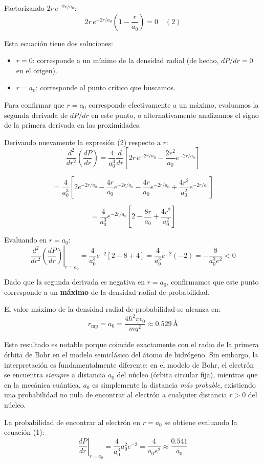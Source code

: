 \documentclass[a4paper]{article}
\begin{document}
Factorizando $2r \, e^{-2r/a_0}$:
$$2r \, e^{-2r/a_0} \left(1 - \frac{r}{a_0}\right) = 0 \quad (2)$$

Esta ecuación tiene dos soluciones:
\begin{itemize}
\item $r = 0$: corresponde a un mínimo de la densidad radial (de hecho, $dP/dr = 0$ en el origen).
\item $r = a_0$: corresponde al punto crítico que buscamos.
\end{itemize}

Para confirmar que $r = a_0$ corresponde efectivamente a un máximo, evaluamos la segunda derivada de $dP/dr$ en este punto, o alternativamente analizamos el signo de la primera derivada en las proximidades.

Derivando nuevamente la expresión (2) respecto a $r$:
$$\frac{d^2}{dr^2}\left(\frac{dP}{dr}\right) = \frac{4}{a_0^3} \frac{d}{dr}\left[2r \, e^{-2r/a_0} - \frac{2r^2}{a_0} e^{-2r/a_0}\right]$$

$$= \frac{4}{a_0^3} \left[2 e^{-2r/a_0} - \frac{4r}{a_0} e^{-2r/a_0} - \frac{4r}{a_0} e^{-2r/a_0} + \frac{4r^2}{a_0^2} e^{-2r/a_0}\right]$$

$$= \frac{4}{a_0^3} e^{-2r/a_0} \left[2 - \frac{8r}{a_0} + \frac{4r^2}{a_0^2}\right]$$

Evaluando en $r = a_0$:
$$\left.\frac{d^2}{dr^2}\left(\frac{dP}{dr}\right)\right|_{r=a_0} = \frac{4}{a_0^3} e^{-2} \left[2 - 8 + 4\right] = \frac{4}{a_0^3} e^{-2} (-2) = -\frac{8}{a_0^3 e^2} < 0$$

Dado que la segunda derivada es negativa en $r = a_0$, confirmamos que este punto corresponde a un \textbf{máximo} de la densidad radial de probabilidad.


El valor máximo de la densidad radial de probabilidad se alcanza en:
$$r_{\text{mp}} = a_0 = \frac{4\hbar^2\pi\epsilon_0}{mq^2} \approx 0.529 \, \text{Å}$$

Este resultado es notable porque coincide exactamente con el radio de la primera órbita de Bohr en el modelo semiclásico del átomo de hidrógeno. Sin embargo, la interpretación es fundamentalmente diferente: en el modelo de Bohr, el electrón se encuentra \textit{siempre} a distancia $a_0$ del núcleo (órbita circular fija), mientras que en la mecánica cuántica, $a_0$ es simplemente la distancia \textit{más probable}, existiendo una probabilidad no nula de encontrar al electrón a cualquier distancia $r > 0$ del núcleo.

La probabilidad de encontrar al electrón en $r = a_0$ se obtiene evaluando la ecuación (1):
$$\left.\frac{dP}{dr}\right|_{r=a_0} = \frac{4}{a_0^3} a_0^2 e^{-2} = \frac{4}{a_0 e^2} \approx \frac{0.541}{a_0}$$
\end{document}
